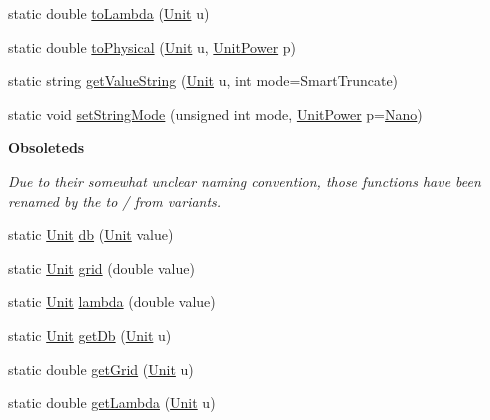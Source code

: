 \begin{DoxyCompactItemize}
\item 
static double \hyperlink{group__DbUGroup_ga4923a9a443871282ad7d331be2a2a5d4}{to\+Lambda} (\hyperlink{group__DbUGroup_ga4fbfa3e8c89347af76c9628ea06c4146}{Unit} u)
\item 
static double \hyperlink{group__DbUGroup_gab901e9d5c12e878728178f113def6c45}{to\+Physical} (\hyperlink{group__DbUGroup_ga4fbfa3e8c89347af76c9628ea06c4146}{Unit} u, \hyperlink{group__DbUGroup_ga50b5785bf4d75026c4c112caec3040a7}{Unit\+Power} p)
\item 
static string \hyperlink{group__DbUGroup_gadc9c1a06b4296dbddcf711077113f4bd}{get\+Value\+String} (\hyperlink{group__DbUGroup_ga4fbfa3e8c89347af76c9628ea06c4146}{Unit} u, int mode=Smart\+Truncate)
\item 
static void \hyperlink{group__DbUGroup_ga89ab8f8326c54113336086663ecf1d25}{set\+String\+Mode} (unsigned int mode, \hyperlink{group__DbUGroup_ga50b5785bf4d75026c4c112caec3040a7}{Unit\+Power} p=\hyperlink{group__DbUGroup_gga50b5785bf4d75026c4c112caec3040a7a03e5923be5810db830626f2ca26319d6}{Nano})
\end{DoxyCompactItemize}
\begin{Indent}\textbf{ Obsoleteds}\par
{\em Due to their somewhat unclear naming convention, those functions have been renamed by the {\itshape to} / {\itshape from} variants. }\begin{DoxyCompactItemize}
\item 
static \hyperlink{group__DbUGroup_ga4fbfa3e8c89347af76c9628ea06c4146}{Unit} \hyperlink{group__DbUGroup_gacd77957381fb93fc4203bdca215e0b48}{db} (\hyperlink{group__DbUGroup_ga4fbfa3e8c89347af76c9628ea06c4146}{Unit} value)
\item 
static \hyperlink{group__DbUGroup_ga4fbfa3e8c89347af76c9628ea06c4146}{Unit} \hyperlink{group__DbUGroup_ga1d4bac6e3b68c8cd44b345de3b425753}{grid} (double value)
\item 
static \hyperlink{group__DbUGroup_ga4fbfa3e8c89347af76c9628ea06c4146}{Unit} \hyperlink{group__DbUGroup_gaa1ba98acc939ff1c370c18544a5e0dce}{lambda} (double value)
\item 
static \hyperlink{group__DbUGroup_ga4fbfa3e8c89347af76c9628ea06c4146}{Unit} \hyperlink{group__DbUGroup_ga4233772b1b3e68f3ec723c7509ea87ff}{get\+Db} (\hyperlink{group__DbUGroup_ga4fbfa3e8c89347af76c9628ea06c4146}{Unit} u)
\item 
static double \hyperlink{group__DbUGroup_gad4485d0d7b5fd7ae87b32f165155c0a2}{get\+Grid} (\hyperlink{group__DbUGroup_ga4fbfa3e8c89347af76c9628ea06c4146}{Unit} u)
\item 
static double \hyperlink{group__DbUGroup_gadea6b9a6e84243f70f3a5e2725b2c6d8}{get\+Lambda} (\hyperlink{group__DbUGroup_ga4fbfa3e8c89347af76c9628ea06c4146}{Unit} u)
\end{DoxyCompactItemize}
\end{Indent}


